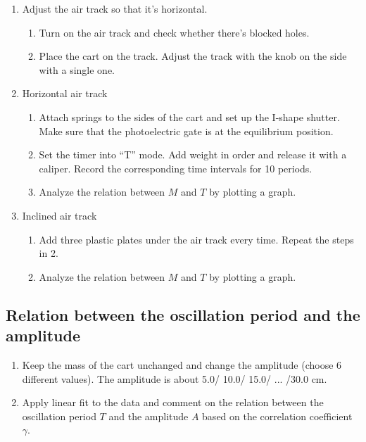 \begin{enumerate}
\item Adjust the air track so that it's horizontal.

\begin{enumerate}
\item Turn on the air track and check whether there's blocked holes.
\item Place the cart on the track. Adjust the track with the knob on the side
  with a single one. 
\end{enumerate}

\item Horizontal air track

\begin{enumerate}
\item Attach springs to the sides of the cart and set up the I-shape shutter.
  Make sure that the photoelectric gate is at the equilibrium position. 
\item Set the timer into ``T'' mode. Add weight in order and release it with a
  caliper. Record the corresponding time intervals for 10 periods. 
\item Analyze the relation between $M$ and $T$ by plotting a graph. 
\end{enumerate}

\item Inclined air track

\begin{enumerate}
\item Add three plastic plates under the air track every time. Repeat the steps
  in 2. 
\item Analyze the relation between $M$ and $T$ by plotting a graph.
\end{enumerate}

\end{enumerate}

\subsection{Relation between the oscillation period and the amplitude} 

\begin{enumerate}

\item Keep the mass of the cart unchanged and change the amplitude (choose 6
  different values). The amplitude is about 5.0/ 10.0/ 15.0/ ... /30.0 cm. 
\item Apply linear fit to the data and comment on the relation between the
  oscillation period $T$ and the amplitude $A$ based on the correlation
  coefficient $\gamma$. 
\end{enumerate}

